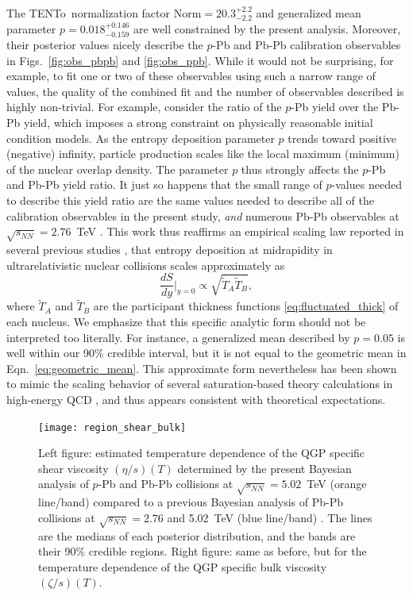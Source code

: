 \documentclass[aps,prc,reprint,amsmath,nofootinbib]{revtex4-1}
\newcommand{\trento}{T\raisebox{-0.5ex}{R}ENTo}
\newcommand{\sqrts}{\sqrt{s_{NN}}}
\newcommand{\T}{\tilde{T}}
\begin{document}
The \trento\ normalization factor ${\text{Norm} = 20.3^{+2.2}_{-2.2}}$ and generalized mean parameter $p=0.018^{+0.146}_{-0.159}$ are well constrained by the present analysis.
Moreover, their posterior values nicely describe the $p$-Pb and Pb-Pb calibration observables in Figs.~\ref{fig:obs_pbpb} and \ref{fig:obs_ppb}.
While it would not be surprising, for example, to fit one or two of these observables using such a narrow range of values, the quality of the combined fit and the number of observables described is highly non-trivial.
For example, consider the ratio of the $p$-Pb yield over the Pb-Pb yield, which imposes a strong constraint on physically reasonable initial condition models.
As the entropy deposition parameter $p$ trends toward positive (negative) infinity, particle production scales like the local maximum (minimum) of the nuclear overlap density.
The parameter $p$ thus strongly affects the $p$-Pb and Pb-Pb yield ratio.
It just so happens that the small range of $p$-values needed to describe this yield ratio are the same values needed to describe all of the calibration observables in the present study, \emph{and} numerous Pb-Pb observables at $\sqrts=2.76$~TeV \cite{Bernhard:2018hnz}.
This work thus reaffirms an empirical scaling law reported in several previous studies \cite{Moreland:2014oya, Bernhard:2016tnd, Ke:2016jrd, Bernhard:2018hnz}, that entropy deposition at midrapidity in ultrarelativistic nuclear collisions scales approximately as
\begin{equation}
  \label{eq:geometric_mean}
  \frac{dS}{dy}\bigg\vert_{y=0} \propto \sqrt{\T_A \T_B},
\end{equation}
where $\T_A$ and $\T_B$ are the participant thickness functions \eqref{eq:fluctuated_thick} of each nucleus.
We emphasize that this specific analytic form should not be interpreted too literally.
For instance, a generalized mean described by $p=0.05$ is well within our 90\% credible interval, but it is not equal to the geometric mean in Eqn.~\ref{eq:geometric_mean}.
This approximate form nevertheless has been shown to mimic the scaling behavior of several saturation-based theory calculations in high-energy QCD \cite{Bernhard:2016tnd}, and thus appears consistent with theoretical expectations.

\begin{figure}
  \texttt{[image: region\_shear\_bulk]}
  \caption{Left figure: estimated temperature dependence of the QGP specific shear viscosity $(\eta/s)(T)$ determined by the present Bayesian analysis of $p$-Pb and Pb-Pb collisions at $\sqrts=5.02$~TeV (orange line/band) compared to a previous Bayesian analysis of Pb-Pb collisions at $\sqrts=2.76$ and 5.02~TeV (blue line/band) \cite{Bernhard:2018hnz}. The lines are the medians of each posterior distribution, and the bands are their 90\% credible regions. Right figure: same as before, but for the temperature dependence of the QGP specific bulk viscosity $(\zeta/s)(T)$.}
  \label{fig:region_shear_bulk}
\end{figure}
\end{document}
